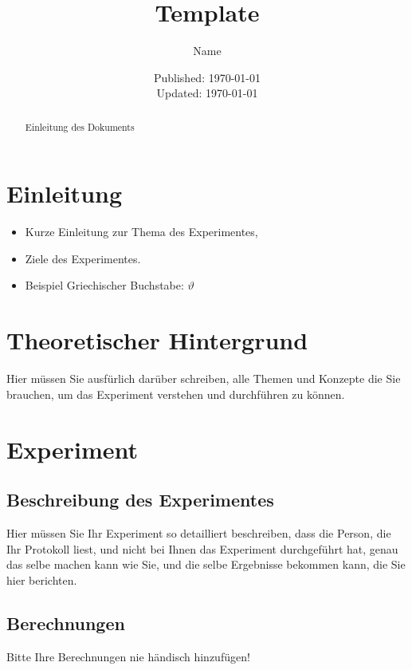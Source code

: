 \documentclass[12pt,a4paper]{article}
\title{Template}
\author{Name}
\date{Published: \today \\ Updated: \today}
\begin{document}
\maketitle
\thispagestyle{empty}
\pagebreak

\renewcommand{\abstractname}{Abstract} %
\begin{abstract} %
	\noindent
	Einleitung des Dokuments
\end{abstract}

\tableofcontents
\pagebreak

\section{Einleitung}

\begin{itemize}
	\item Kurze Einleitung zur Thema des Experimentes,
	\item Ziele des Experimentes.
	\item Beispiel Griechischer Buchstabe: $\vartheta$
\end{itemize}

\section{Theoretischer Hintergrund}
Hier müssen Sie ausfürlich darüber schreiben, alle 
Themen und Konzepte die Sie brauchen, um das 
Experiment verstehen und durchführen zu können.

\section{Experiment}
\label{sec:Experiment}

	\subsection{Beschreibung des Experimentes}
	Hier müssen Sie Ihr Experiment so detailliert beschreiben, 
	dass die Person, die Ihr Protokoll liest, und nicht bei Ihnen 
	das Experiment durchgeführt hat, genau das selbe 
	machen kann wie Sie, und die selbe Ergebnisse bekommen 
	kann, die Sie hier berichten.

	\subsection{Berechnungen}
	Bitte Ihre Berechnungen nie händisch hinzufügen!
	
\end{document}
